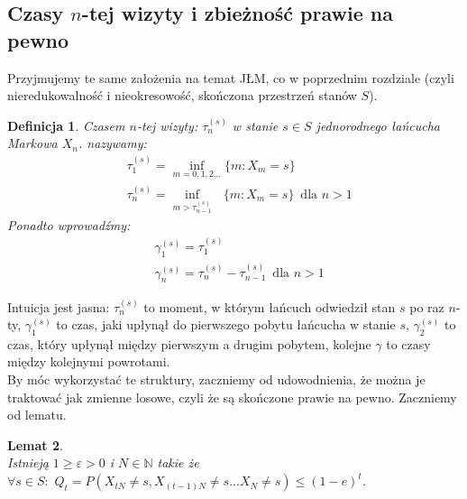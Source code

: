 \documentclass[a4paper]{article}
\theoremstyle{defn}
\newtheorem{defn}{Definicja}[subsection]
\theoremstyle{theorem}
\theoremstyle{lemma}
\newtheorem{lemma}[defn]{Lemat}
\theoremstyle{cor}
\theoremstyle{fact}
\begin{document}
\subsection{Czasy $n$-tej wizyty i zbieżność prawie na pewno}
\label{sect2.5}
Przyjmujemy te same założenia na temat JŁM, co w poprzednim rozdziale (czyli nieredukowalność i nieokresowość, skończona przestrzeń stanów $S$).
\begin{defn}\label{defn2.5.1}
Czasem $n$-tej wizyty:  $\tau_n^{(s)}$  w stanie $s \in S$ jednorodnego łańcucha Markowa $X_n$. nazywamy:\\
\begin{align*}
&\tau_1^{(s)} = \inf_{m = 0,1,2...} \{m: X_m = s\}\\
&\tau_n^{(s)} = \inf_{m > \tau_{n-1}^{(s)}} \,\,\,\,\{m: X_m = s\} \,\,\, \text{dla $n > 1$}
\end{align*}
Ponadto wprowadźmy:
\begin{align*}
    &\gamma_1^{(s)} = \tau_1^{(s)}\\
    &\gamma_n^{(s)} = \tau_n^{(s)} - \tau_{n-1}^{(s)}\,\,\,\text{dla $n > 1$}
\end{align*}
\end{defn}
Intuicja jest jasna: $\tau_n^{(s)}$ to moment, w którym łańcuch odwiedził stan $s$ po raz $n$-ty, $\gamma_1^{(s)}$ to czas, jaki upłynął do pierwszego pobytu łańcucha w stanie $s$, $\gamma_2^{(s)}$ to czas, który upłynął między pierwszym a drugim pobytem, kolejne $\gamma$ to czasy między kolejnymi powrotami.\\
By móc wykorzystać te struktury, zaczniemy od udowodnienia, że można je traktować jak zmienne losowe, czyli że są skończone prawie na pewno. Zaczniemy od lematu.
\begin{lemma}\label{lemma2.5.2}
\\ Istnieją $1 \geq \varepsilon > 0$ i $N \in \mathbb{N}$ takie że $\forall s \in S: \,\, Q_t = P(X_{tN} \neq s, X_{(t-1)N} \neq s ... X_N \neq s) \leq (1-e)^t$.
\end{lemma}
\end{document}

